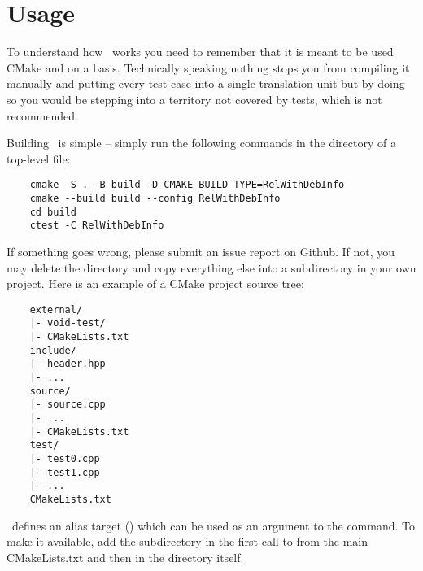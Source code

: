 \section{Usage}

To understand how \voidtest\ works you need to remember that it is meant to be used 
CMake and on a  basis. Technically speaking nothing stops you from
compiling it manually and putting every test case into a single translation unit but by doing so
you would be stepping into a territory not covered by tests, which is not recommended. \par
Building \voidtest\ is simple -- simply run the following commands in the directory of a top-level
 file:

\begin{verbatim}
    cmake -S . -B build -D CMAKE_BUILD_TYPE=RelWithDebInfo
    cmake --build build --config RelWithDebInfo
    cd build
    ctest -C RelWithDebInfo
\end{verbatim}

\noindent If something goes wrong, please submit an issue report on Github. If not, you may delete
the  directory and copy everything else into a subdirectory in your own project.
Here is an example of a CMake project source tree:

\begin{verbatim}
    external/
    |- void-test/
    |- CMakeLists.txt
    include/
    |- header.hpp
    |- ...
    source/
    |- source.cpp
    |- ...
    |- CMakeLists.txt
    test/
    |- test0.cpp
    |- test1.cpp
    |- ...
    CMakeLists.txt
\end{verbatim}

\noindent \voidtest\ defines an alias target () which can be used as
an argument to the  command. To make it available, add the
 subdirectory in the first call to  from the
main {CMakeLists.txt} and then  in the 
directory itself.
